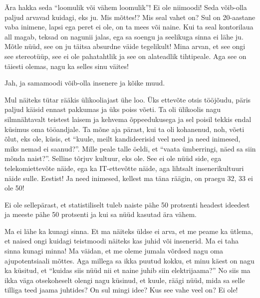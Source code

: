 
Ära hakka seda \enquote{loomulik või vähem loomulik}!  Ei ole niimoodi! Seda 
võib-olla paljud arvavad kuidagi, eks ju. Mis mõttes!? Mis seal vahet on? Sul 
on 20-aastane vaba inimene, lapsi ega peret ei ole, on ta mees või naine. Kui 
ta seal kontorilaua all magab, teksad on nagunii jalas, ega sa soengu ja 
seelikuga sinna ei lähe ju. Mõtle nüüd, see on ju täitsa absurdne väide 
tegelikult! Mina arvan, et see ongi see stereotüüp, see ei ole pahatahtlik ja 
see on alateadlik tihtipeale. Aga see on täiesti olemas, nagu ka selles sinu 
väites!


Jah, ja samamoodi võib-olla insenere ja kõike muud.


Mul näiteks tütar rääkis ülikooliajast ühe loo. Üks ettevõte otsis tööjõudu, 
päris paljud käisid ennast pakkumas ja üks poiss võeti. Ta oli ülikoolis nagu 
silmnähtavalt teistest laisem ja kehvema õppeedukusega ja sel poisil tekkis 
endal küsimus oma tööandjale. Ta mõne aja pärast, kui ta oli kohanenud, noh, 
võeti õlut, eks ole, küsis, et \enquote{kuule, meilt kandideerisid veel need ja 
need inimesed, miks nemad ei saanud?}. Mille peale talle öeldi, et 
\enquote{vaata ümberringi, näed sa siin mõnda naist?}. Selline tõrjuv kultuur, 
eks ole. See ei ole nüüd side, ega telekomiettevõte näide, ega ka IT-ettevõtte 
näide, aga lihtsalt insenerikultuuri näide sulle. Eestist! Ja need inimesed, 
kellest ma täna räägin, on praegu 32, 33 ei ole 50!


Ei ole sellepärast, et statistiliselt tuleb naiste pähe 50 protsenti headest 
ideedest ja meeste pähe 50 protsenti ja kui sa nüüd kasutad ära vähem.


Ma ei lähe ka kunagi sinna. Et ma näiteks üldse ei arva, et me peame ka ütlema, 
et naised ongi kuidagi teistmoodi näiteks kas juhid või insenerid. Ma ei taha 
sinna kunagi minna! Ma väidan, et me oleme jumala võrdsed nagu oma 
ajupotentsiaali mõttes. Aga millega sa ikka puutud kokku, et minu käest on nagu 
ka küsitud, et \enquote{kuidas siis nüüd nii et naine juhib siin elektrijaama?} 
No siis ma ikka väga otsekoheselt olengi nagu küsinud, et kuule, räägi nüüd, 
mida sa selle tilliga teed jaama juhtides? On sul mingi idee? Kus see vahe veel 
on? Ei ole!

